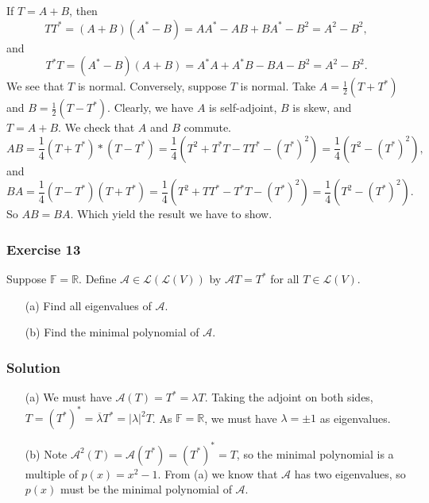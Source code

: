 If $T = A + B$, then
\begin{equation*}
    TT^* = (A + B)(A^* - B)
        = AA^* - AB + BA^* - B^2
        = A^2 - B^2,
\end{equation*}
and
\begin{equation*}
    T^*T = (A^* - B)(A + B)
        = A^*A + A^*B - BA - B^2
        = A^2 - B^2.
\end{equation*}
We see that $T$ is normal.
Conversely, suppose $T$ is normal.
Take $A = \frac{1}{2}(T + T^*)$ and $B = \frac{1}{2}(T - T^*)$.
Clearly, we have $A$ is self-adjoint, $B$ is skew, and $T = A + B$.
We check that $A$ and $B$ commute.
\begin{equation*}
    AB = \frac{1}{4}(T + T^*)*(T - T^*)
        = \frac{1}{4}(T^2 + T^*T - TT^* - (T^*)^2)
        = \frac{1}{4}(T^2 - (T^*)^2),
\end{equation*}
and
\begin{equation*}
    BA = \frac{1}{4}(T - T^*)(T + T^*)
        = \frac{1}{4}(T^2 + TT^* - T^*T - (T^*)^2)
        = \frac{1}{4}(T^2 - (T^*)^2).
\end{equation*}
So $AB = BA$.
Which yield the result we have to show.


\subsubsection*{Exercise 13}

Suppose $\mathbb{F} = \mathbb{R}$.
Define $\mathcal{A} \in \mathcal{L}(\mathcal{L}(V))$ by $\mathcal{A}T = T^*$ for all $T \in \mathcal{L}(V)$.
\begin{itemize}
    \item[(a)] Find all eigenvalues of $\mathcal{A}$.
    \item[(b)] Find the minimal polynomial of $\mathcal{A}$.
\end{itemize}

\subsubsection*{Solution}

\begin{itemize}
    \item[(a)] We must have $\mathcal{A}(T) = T^* = \lambda T$.
        Taking the adjoint on both sides, $T = (T^*)^* = \overline{\lambda} T^* = |\lambda|^2 T$.
        As $\mathbb{F} = \mathbb{R}$, we must have $\lambda = \pm 1$ as eigenvalues.
    \item[(b)] Note $\mathcal{A}^2(T) = \mathcal{A}(T^*) = (T^*)^* = T$, so the minimal polynomial is a multiple of $p(x) = x^2 - 1$.
        From (a) we know that $\mathcal{A}$ has two eigenvalues, so $p(x)$ must be the minimal polynomial of $\mathcal{A}$.
\end{itemize}


